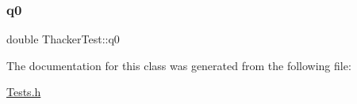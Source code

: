 \mbox{\label{classThackerTest_a770dc7e3393c068de49067a85eab799d}} 
\subsubsection{\texorpdfstring{q0}{q0}}
{\footnotesize\ttfamily double Thacker\+Test\+::q0\hspace{0.3cm}{\ttfamily [protected]}}



The documentation for this class was generated from the following file\+:\begin{DoxyCompactItemize}
\item 
\hyperlink{Tests_8h}{Tests.\+h}\end{DoxyCompactItemize}
